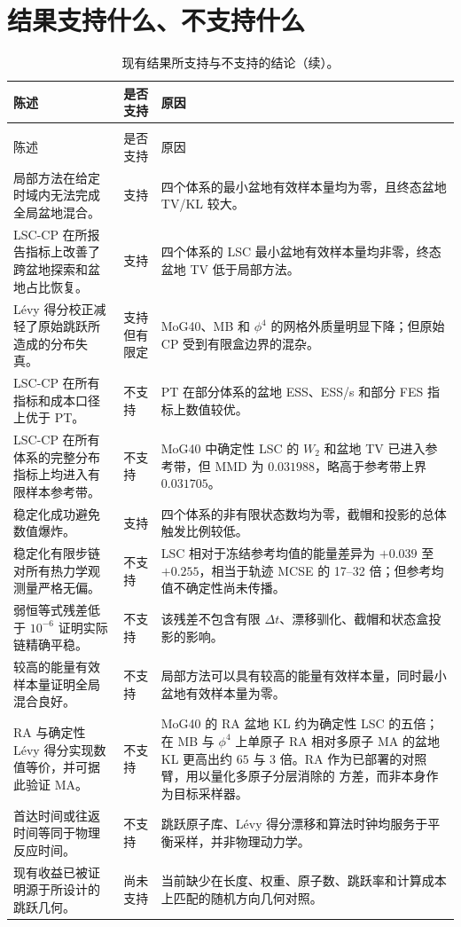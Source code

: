 \documentclass[11pt,a4paper]{article}
\begin{document}
\section{结果支持什么、不支持什么}

\begin{longtable}{L{8.2cm}C{2.1cm}L{4.0cm}}
\caption{现有结果所支持与不支持的结论。}\label{tab:zh-evidence-boundaries}\\
\toprule
陈述 & 是否支持 & 原因 \\
\midrule
\endfirsthead
\caption[]{现有结果所支持与不支持的结论（续）。}\\
\toprule
陈述 & 是否支持 & 原因 \\
\midrule
\endhead
局部方法在给定时域内无法完成全局盆地混合。 &
支持 &
四个体系的最小盆地有效样本量均为零，且终态盆地 TV/KL 较大。 \\
LSC-CP 在所报告指标上改善了跨盆地探索和盆地占比恢复。 &
支持 &
四个体系的 LSC 最小盆地有效样本量均非零，终态盆地 TV 低于局部方法。 \\
Lévy 得分校正减轻了原始跳跃所造成的分布失真。 &
支持但有限定 &
MoG40、MB 和 $\phi^4$ 的网格外质量明显下降；但原始 CP 受到有限盒边界的混杂。 \\
LSC-CP 在所有指标和成本口径上优于 PT。 &
不支持 &
PT 在部分体系的盆地 ESS、ESS/s 和部分 FES 指标上数值较优。 \\
LSC-CP 在所有体系的完整分布指标上均进入有限样本参考带。 &
不支持 &
MoG40 中确定性 LSC 的 $W_2$ 和盆地 TV 已进入参考带，但 MMD 为
$0.031988$，略高于参考带上界 $0.031705$。 \\
稳定化成功避免数值爆炸。 &
支持 &
四个体系的非有限状态数均为零，截帽和投影的总体触发比例较低。 \\
稳定化有限步链对所有热力学观测量严格无偏。 &
不支持 &
LSC 相对于冻结参考均值的能量差异为 $+0.039$ 至 $+0.255$，相当于轨迹 MCSE 的
17--32 倍；但参考均值不确定性尚未传播。 \\
弱恒等式残差低于 $10^{-6}$ 证明实际链精确平稳。 &
不支持 &
该残差不包含有限 $\Delta t$、漂移驯化、截帽和状态盒投影的影响。 \\
较高的能量有效样本量证明全局混合良好。 &
不支持 &
局部方法可以具有较高的能量有效样本量，同时最小盆地有效样本量为零。 \\
RA 与确定性 Lévy 得分实现数值等价，并可据此验证 MA。 &
不支持 &
MoG40 的 RA 盆地 KL 约为确定性 LSC 的五倍；在 MB 与 $\phi^4$ 上单原子 RA 相对多原子
MA 的盆地 KL 更高出约 $65$ 与 $3$ 倍。RA 作为已部署的对照臂，用以量化多原子分层消除的
方差，而非本身作为目标采样器。 \\
首达时间或往返时间等同于物理反应时间。 &
不支持 &
跳跃原子库、Lévy 得分漂移和算法时钟均服务于平衡采样，并非物理动力学。 \\
现有收益已被证明源于所设计的跳跃几何。 &
尚未支持 &
当前缺少在长度、权重、原子数、跳跃率和计算成本上匹配的随机方向几何对照。 \\
\bottomrule
\end{longtable}
\end{document}
